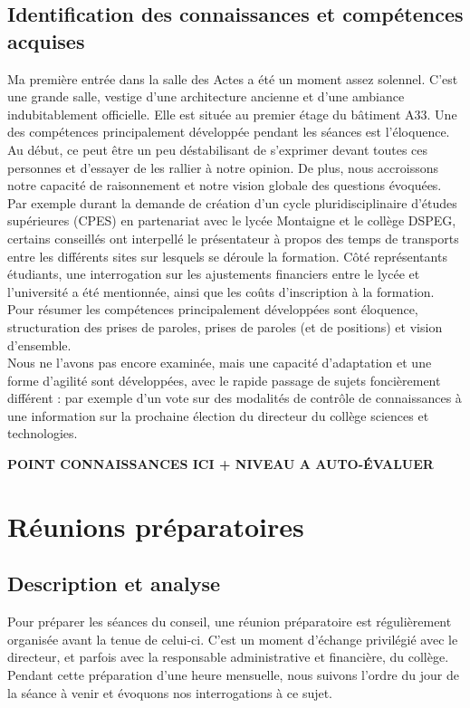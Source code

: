 \documentclass{article}
\begin{document}
\subsection{Identification des connaissances et compétences acquises}
Ma première entrée dans la salle des Actes a été un moment assez solennel. 
C'est une grande salle, vestige d'une architecture ancienne et d'une ambiance indubitablement officielle. 
Elle est située au premier étage du bâtiment A33. 
Une des compétences principalement développée pendant les séances est l'éloquence. 
Au début, ce peut être un peu déstabilisant de s'exprimer devant toutes ces personnes et d'essayer de les rallier à notre opinion. 
De plus, nous accroissons notre capacité de raisonnement et notre vision globale des questions évoquées. 
Par exemple durant la demande de création d'un cycle pluridisciplinaire d'études supérieures (CPES) en partenariat avec le lycée Montaigne et le collège DSPEG, certains conseillés ont interpellé le présentateur à propos des temps de transports entre les différents sites sur lesquels se déroule la formation. 
Côté représentants étudiants, une interrogation sur les ajustements financiers entre le lycée et l'université a été mentionnée, ainsi que les coûts d'inscription à la formation.
Pour résumer les compétences principalement développées sont éloquence, structuration des prises de paroles, prises de paroles (et de positions) et vision d'ensemble. \\ 
Nous ne l'avons pas encore examinée, mais une capacité d'adaptation et une forme d'agilité sont développées, avec le rapide passage de sujets foncièrement différent : par exemple d'un vote sur des modalités de contrôle de connaissances à une information sur la prochaine élection du directeur du collège sciences et technologies. \par
\textbf{POINT CONNAISSANCES ICI + NIVEAU A AUTO-ÉVALUER}

\newpage

\section{Réunions préparatoires} 

\subsection{Description et analyse}
Pour préparer les séances du conseil, une réunion préparatoire est régulièrement organisée avant la tenue de celui-ci. 
C'est un moment d'échange privilégié avec le directeur, et parfois avec la responsable administrative et financière, du collège. 
Pendant cette préparation d'une heure mensuelle, nous suivons l'ordre du jour de la séance à venir et évoquons nos interrogations à ce sujet. 
\end{document}
